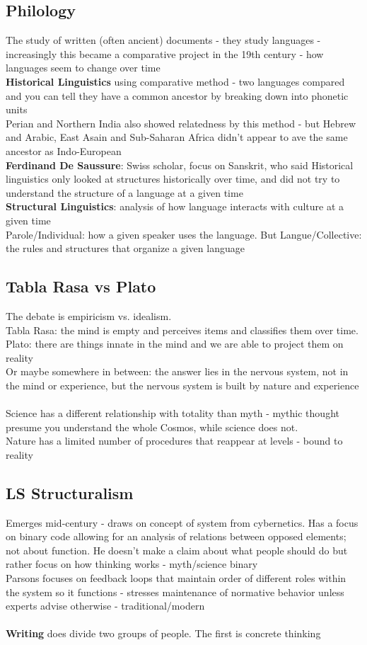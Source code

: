 \documentclass{article}
\begin{document}
\subsection{Philology}
The study of written (often ancient) documents - they study languages - increasingly this became a comparative project in the 19th century - how languages seem to change over time \\
\textbf{Historical Linguistics} using comparative method - two languages compared and you can tell they have a common ancestor by breaking down into phonetic units \\
Perian and Northern India also showed relatedness by this method - but Hebrew and Arabic, East Asain and Sub-Saharan Africa didn't appear to ave the same ancestor as Indo-European \\
\textbf{Ferdinand De Saussure}: Swiss scholar, focus on Sanskrit, who said Historical linguistics only looked at structures historically over time, and did not try to understand the structure of a language at a given time \\
\textbf{Structural Linguistics}: analysis of how language interacts with culture at a given time \\
Parole/Individual: how a given speaker uses the language. But Langue/Collective: the rules and structures that organize a given language 
\subsection{Tabla Rasa vs Plato}
The debate is empiricism vs. idealism. \\
Tabla Rasa: the mind is empty and perceives items and classifies them over time. \\
Plato: there are things innate in the mind and we are able to project them on reality \\
Or maybe somewhere in between: the answer lies in the nervous system, not in the mind or experience, but the nervous system is built by nature and experience \\ \\
Science has a different relationship with totality than myth - mythic thought presume you understand the whole Cosmos, while science does not.\\
Nature has a limited number of procedures that reappear at levels - bound to reality \\
\subsection{LS Structuralism}
Emerges mid-century - draws on concept of system from cybernetics. Has a focus on binary code allowing for an analysis of relations between opposed elements; not about function. He doesn't make a claim about what people should do but rather focus on how thinking works - myth/science binary \\
Parsons focuses on feedback loops that maintain order of different roles within the system so it functions - stresses maintenance of normative behavior unless experts advise otherwise - traditional/modern \\ \\
\textbf{Writing} does divide two groups of people. The first is concrete thinking 
\end{document}
